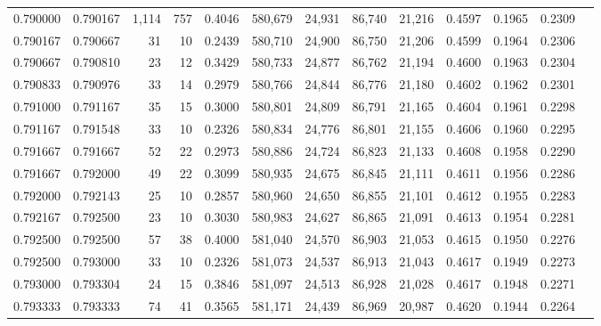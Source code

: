 \begin{tabular}{rrrrrrrrrrrrr}
0.790000 & 0.790167 & 1,114 & 757 &                                     0.4046 & 580,679 &  24,931 &  86,740 &  21,216 & 0.4597 & 0.1965 & 0.2309 \\
0.790167 & 0.790667 &    31 &  10 &                                     0.2439 & 580,710 &  24,900 &  86,750 &  21,206 & 0.4599 & 0.1964 & 0.2306 \\
0.790667 & 0.790810 &    23 &  12 &                                     0.3429 & 580,733 &  24,877 &  86,762 &  21,194 & 0.4600 & 0.1963 & 0.2304 \\
0.790833 & 0.790976 &    33 &  14 &                                     0.2979 & 580,766 &  24,844 &  86,776 &  21,180 & 0.4602 & 0.1962 & 0.2301 \\
0.791000 & 0.791167 &    35 &  15 &                                     0.3000 & 580,801 &  24,809 &  86,791 &  21,165 & 0.4604 & 0.1961 & 0.2298 \\
0.791167 & 0.791548 &    33 &  10 &                                     0.2326 & 580,834 &  24,776 &  86,801 &  21,155 & 0.4606 & 0.1960 & 0.2295 \\
0.791667 & 0.791667 &    52 &  22 &                                     0.2973 & 580,886 &  24,724 &  86,823 &  21,133 & 0.4608 & 0.1958 & 0.2290 \\
0.791667 & 0.792000 &    49 &  22 &                                     0.3099 & 580,935 &  24,675 &  86,845 &  21,111 & 0.4611 & 0.1956 & 0.2286 \\
0.792000 & 0.792143 &    25 &  10 &                                     0.2857 & 580,960 &  24,650 &  86,855 &  21,101 & 0.4612 & 0.1955 & 0.2283 \\
0.792167 & 0.792500 &    23 &  10 &                                     0.3030 & 580,983 &  24,627 &  86,865 &  21,091 & 0.4613 & 0.1954 & 0.2281 \\
0.792500 & 0.792500 &    57 &  38 &                                     0.4000 & 581,040 &  24,570 &  86,903 &  21,053 & 0.4615 & 0.1950 & 0.2276 \\
0.792500 & 0.793000 &    33 &  10 &                                     0.2326 & 581,073 &  24,537 &  86,913 &  21,043 & 0.4617 & 0.1949 & 0.2273 \\
0.793000 & 0.793304 &    24 &  15 &                                     0.3846 & 581,097 &  24,513 &  86,928 &  21,028 & 0.4617 & 0.1948 & 0.2271 \\
0.793333 & 0.793333 &    74 &  41 &                                     0.3565 & 581,171 &  24,439 &  86,969 &  20,987 & 0.4620 & 0.1944 & 0.2264 \\

\end{tabular}
